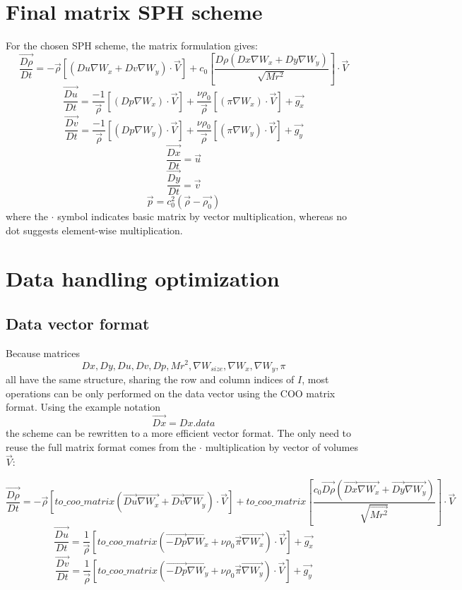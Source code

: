 \documentclass{article}
\begin{document}
\section{Final matrix SPH scheme}
For the chosen SPH scheme, the matrix formulation gives:
$$
\overrightarrow{\frac{D\rho}{Dt}}=-\Vec{\rho}\left[\left(Du\nabla W_x + Dv \nabla W_y\right)\cdot\Vec{V}\right]
+
c_0\left[\frac{D\rho\left(Dx\nabla W_x + Dy\nabla W_y \right)}{\sqrt{Mr^2}}\right]\cdot\Vec{V}
$$
$$
\overrightarrow{\frac{Du}{Dt}}=\frac{-1}{\Vec{\rho}}\left[\left(Dp\nabla W_x\right)\cdot\Vec{V}\right]+\frac{\nu\rho_0}{\Vec{\rho}}\left[\left(\pi\nabla W_x\right)\cdot\Vec{V}\right]+\Vec{g_x}
$$
$$
\overrightarrow{\frac{Dv}{Dt}}=\frac{-1}{\Vec{\rho}}\left[\left(Dp\nabla W_y\right)\cdot\Vec{V}\right]+\frac{\nu\rho_0}{\Vec{\rho}}\left[\left(\pi\nabla W_y\right)\cdot\Vec{V}\right]+\Vec{g_y}
$$
$$\overrightarrow{\frac{Dx}{Dt}}=\Vec{u}$$
$$\overrightarrow{\frac{Dy}{Dt}}=\Vec{v}$$
$$
\vec{p}=c_0^2\left(\Vec{\rho}-\Vec{\rho_0}\right)
$$
where the $\cdot$ symbol indicates basic matrix by vector multiplication, whereas no dot suggests element-wise multiplication. 
\section{Data handling optimization}
\subsection{Data vector format}
Because matrices 
$$Dx, Dy, Du, Dv, Dp, Mr^2, \nabla W_{size}, \nabla W_x, \nabla W_y, \pi$$
all have the same structure, sharing the row and column indices of $I$, most operations can be only performed on the data vector using the COO matrix format. Using the example notation
$$\vec{Dx} = Dx.data$$
the scheme can be rewritten to a more efficient vector format. The only need to reuse the full matrix format comes from the $\cdot$ multiplication by vector of volumes $\Vec{V}$:

$$
\overrightarrow{\frac{D\rho}{Dt}}
=
-\Vec{\rho}\left[to\_coo\_matrix\left(\vec{Du}\vec{\nabla W_x} + \vec{Dv} \vec{\nabla W_y}\right)\cdot\Vec{V}\right]
+
to\_coo\_matrix\left[\frac{c_0 \Vec{D\rho}\left(\Vec{Dx}\Vec{\nabla W_x} + \Vec{Dy}\Vec{\nabla W_y} \right)}{\sqrt{\Vec{Mr^2}}}\right]\cdot\Vec{V}
$$
$$
\overrightarrow{\frac{Du}{Dt}}
=
\frac{1}{\Vec{\rho}}\left[to\_coo\_matrix\left(\vec{-Dp}\vec{\nabla W_x}+\nu\rho_0\vec{\pi}\vec{\nabla W_x}\right)\cdot\Vec{V}\right]+\Vec{g_x}
$$
$$
\overrightarrow{\frac{Dv}{Dt}}
=
\frac{1}{\Vec{\rho}}\left[to\_coo\_matrix\left(\vec{-Dp}\vec{\nabla W_y}+\nu\rho_0\vec{\pi}\vec{\nabla W_y}\right)\cdot\Vec{V}\right]+\Vec{g_y}
$$
\end{document}
